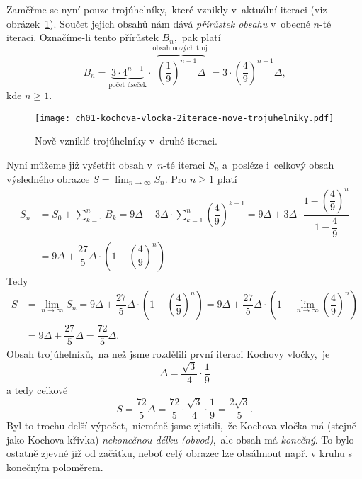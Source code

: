 Zaměřme se nyní pouze trojúhelníky,~které vznikly v~aktuální iteraci (viz obrázek~\ref{fig:kochova_vlocka_2iterace_nove_trojuhelniky}). Součet jejich obsahů nám dává \emph{přírůstek obsahu} v~obecné $n$-té iteraci. Označíme-li tento přírůstek $B_n$,~pak platí
\[B_n=\underbrace{3\cdot 4^{n-1}}_{\text{počet úseček}}\cdot\overbrace{\left(\dfrac{1}{9}\right)^{n-1}\Delta}^{\text{obsah nových troj.}}=3\cdot\left(\dfrac{4}{9}\right)^{n-1}\Delta,\]
kde $n\geqslant 1$.
\begin{figure}[h]
    \centering
    \texttt{[image: ch01-kochova-vlocka-2iterace-nove-trojuhelniky.pdf]}
    \caption{Nově vzniklé trojúhelníky v~druhé iteraci.}
    \label{fig:kochova_vlocka_2iterace_nove_trojuhelniky}
\end{figure}
Nyní můžeme již vyšetřit obsah v~$n$-té iteraci $S_n$ a~posléze i~celkový obsah výsledného obrazce $S=\lim_{n\to\infty}{S_n}$. Pro $n\geqslant 1$ platí
\begin{align*}
    S_n&=S_0+\sum_{k=1}^{n}{B_k}=9\Delta+3\Delta\cdot\sum_{k=1}^{n}{\left(\dfrac{4}{9}\right)^{k-1}}=9\Delta+3\Delta\cdot\dfrac{1-\left(\dfrac{4}{9}\right)^{n}}{1-\dfrac{4}{9}}\\
    &=9\Delta+\dfrac{27}{5}\Delta\cdot\left(1-\left(\dfrac{4}{9}\right)^n\right)
\end{align*}
Tedy
\begin{align*}
    S&=\lim_{n\to\infty}{S_n}=9\Delta+\dfrac{27}{5}\Delta\cdot\left(1-\left(\dfrac{4}{9}\right)^n\right)=9\Delta+\dfrac{27}{5}\Delta\cdot\left(1-\lim_{n\to\infty}\left(\dfrac{4}{9}\right)^n\right)\\
    &=9\Delta+\dfrac{27}{5}\Delta=\dfrac{72}{5}\Delta.
\end{align*}
Obsah trojúhelníků,~na než jsme rozdělili první iteraci Kochovy vločky,~je
\[\Delta=\dfrac{\sqrt{3}}{4}\cdot\dfrac{1}{9}\]
a tedy celkově
\[S=\dfrac{72}{5}\Delta=\dfrac{72}{5}\cdot\dfrac{\sqrt{3}}{4}\cdot\dfrac{1}{9}=\dfrac{2\sqrt{3}}{5}.\]
Byl to trochu delší výpočet,~nicméně jsme zjistili,~že Kochova vločka má (stejně jako Kochova křivka) \emph{nekonečnou délku (obvod)},~ale obsah má \emph{konečný}. To bylo ostatně zjevné již od začátku, neboť celý obrazec lze obsáhnout např. v kruhu s konečným poloměrem.
